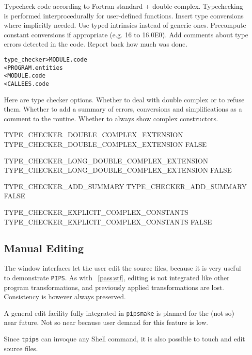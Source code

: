 \documentclass[a4paper]{report}
\newenvironment{PipsMake}{\begin{alltt}}{\end{alltt}}
\newcommand{\PipsPassRef}[1]{\texttt{\detokenize{#1}}~\ref{pass:#1}}
\newcommand{\Pipsmake}{\texttt{pipsmake}}
\begin{document}
Typecheck code according to Fortran standard + double-complex.
Typechecking is performed interprocedurally for user-defined functions.
Insert type conversions where implicitly needed.
Use typed intrinsics instead of generic ones.
Precompute constant conversions if appropriate (e.g. 16 to 16.0E0).
Add comments about type errors detected in the code.
Report back how much was done.

\begin{PipsMake}
type_checker            > MODULE.code
        < PROGRAM.entities
        < MODULE.code
        < CALLEES.code
\end{PipsMake}

Here are type checker options. Whether to deal with double complex or to
refuse them. Whether to add a summary of errors, conversions and
simplifications as a comment to the routine. Whether to always show complex
constructors.

\begin{PipsProp}{TYPE_CHECKER_DOUBLE_COMPLEX_EXTENSION}
TYPE_CHECKER_DOUBLE_COMPLEX_EXTENSION FALSE
\end{PipsProp}
\begin{PipsProp}{TYPE_CHECKER_LONG_DOUBLE_COMPLEX_EXTENSION}
TYPE_CHECKER_LONG_DOUBLE_COMPLEX_EXTENSION FALSE
\end{PipsProp}
\begin{PipsProp}{TYPE_CHECKER_ADD_SUMMARY}
TYPE_CHECKER_ADD_SUMMARY FALSE
\end{PipsProp}
\begin{PipsProp}{TYPE_CHECKER_EXPLICIT_COMPLEX_CONSTANTS}
TYPE_CHECKER_EXPLICIT_COMPLEX_CONSTANTS FALSE
\end{PipsProp}

\subsection{Manual Editing}

The window interfaces let the user edit the source files, because it
is very useful to demonstrate {\tt PIPS}. As with
\PipsPassRef{stf}, editing is not integrated like other program
transformations, and previously applied transformations are lost.
Consistency is however always preserved.

A general edit facility fully integrated in \Pipsmake{} is planned
for the (not so) near future. Not so near because user demand for this
feature is low.

Since {\tt tpips} can invoque any Shell command, it is also possible
to touch and edit source files.
\end{document}
